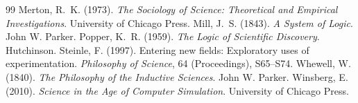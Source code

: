 \documentclass{situationist-preprint}
\begin{document}
\begin{thebibliography}{99}
 Merton, R.~K. (1973). \emph{The Sociology of Science: Theoretical and Empirical Investigations}. University of Chicago Press.
 Mill, J.~S. (1843). \emph{A System of Logic}. John W. Parker.
 Popper, K.~R. (1959). \emph{The Logic of Scientific Discovery}. Hutchinson.
 Steinle, F. (1997). Entering new fields: Exploratory uses of experimentation. \emph{Philosophy of Science}, 64 (Proceedings), S65--S74.
 Whewell, W. (1840). \emph{The Philosophy of the Inductive Sciences}. John W. Parker.
 Winsberg, E. (2010). \emph{Science in the Age of Computer Simulation}. University of Chicago Press.
\end{thebibliography}
\end{document}
